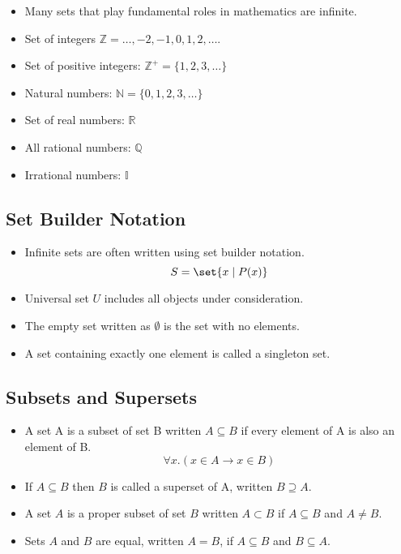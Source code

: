\documentclass[8pt]{scrreprt}
\begin{document}
\begin{landscape}
\begin{multicols*}{3}
\begin{definition}
	\begin{itemize}
		\item Many sets that play fundamental roles in mathematics are infinite.
		\item Set of integers $\mathbb{Z}={\ldots, -2, -1, 0, 1, 2, \ldots}$.
		\item Set of positive integers: $\mathbb{Z}^+=\{1,2,3,\ldots\}$
		\item Natural numbers: $\mathbb{N}=\{0,1,2,3,\ldots\}$
		\item Set of real numbers: $\mathbb{R}$
		\item All rational numbers: $\mathbb{Q}$
		\item Irrational numbers: $\mathbb{I}$
	\end{itemize}
\end{definition}

\subsection{Set Builder Notation}

\begin{itemize}
	\item Infinite sets are often written using set builder notation.
	      \[
		      S = \set{x\mid P(x)}
	      \]
\end{itemize}

\begin{itemize}
	\item Universal set $U$ includes all objects under consideration.
	\item The empty set written as $\emptyset$ is the set with no elements.
	\item A set containing exactly one element is called a singleton set.
\end{itemize}

\subsection{Subsets and Supersets}
\begin{itemize}
	\item A set A is a subset of set B written $A\subseteq B$ if every element of A is also an element of B.
	      \[
		      \forall x.(x\in A\rightarrow x\in B)
	      \]

	\item If $A\subseteq B$ then $B$ is called a superset of A, written $B\supseteq A$.
	\item A set $A$ is a proper subset of set $B$ written $A\subset B$ if $A\subseteq B$ and $A\neq B$.
	\item Sets $A$ and $B$ are equal, written $A=B$, if $A\subseteq B$ and $B\subseteq A$.
\end{itemize}


\end{multicols*}
\end{landscape}
\end{document}
